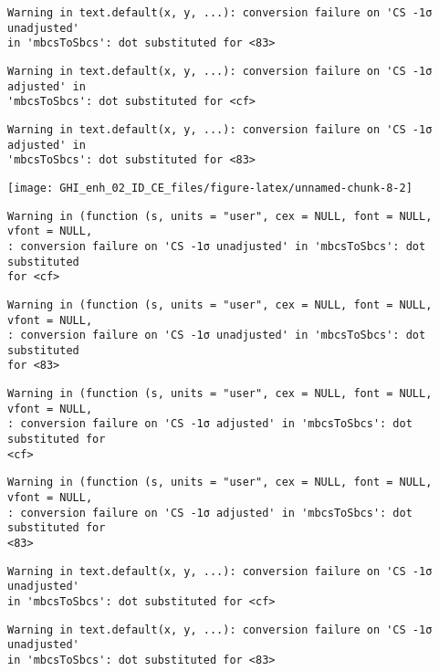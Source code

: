 \documentclass[
  10pt,
  a4paper,oneside]{article}
\begin{document}
\begin{verbatim}
Warning in text.default(x, y, ...): conversion failure on 'CS -1σ unadjusted'
in 'mbcsToSbcs': dot substituted for <83>
\end{verbatim}

\begin{verbatim}
Warning in text.default(x, y, ...): conversion failure on 'CS -1σ adjusted' in
'mbcsToSbcs': dot substituted for <cf>
\end{verbatim}

\begin{verbatim}
Warning in text.default(x, y, ...): conversion failure on 'CS -1σ adjusted' in
'mbcsToSbcs': dot substituted for <83>
\end{verbatim}

\begin{center}\texttt{[image: GHI\_enh\_02\_ID\_CE\_files/figure-latex/unnamed-chunk-8-2]} \end{center}

\begin{verbatim}
Warning in (function (s, units = "user", cex = NULL, font = NULL, vfont = NULL,
: conversion failure on 'CS -1σ unadjusted' in 'mbcsToSbcs': dot substituted
for <cf>
\end{verbatim}

\begin{verbatim}
Warning in (function (s, units = "user", cex = NULL, font = NULL, vfont = NULL,
: conversion failure on 'CS -1σ unadjusted' in 'mbcsToSbcs': dot substituted
for <83>
\end{verbatim}

\begin{verbatim}
Warning in (function (s, units = "user", cex = NULL, font = NULL, vfont = NULL,
: conversion failure on 'CS -1σ adjusted' in 'mbcsToSbcs': dot substituted for
<cf>
\end{verbatim}

\begin{verbatim}
Warning in (function (s, units = "user", cex = NULL, font = NULL, vfont = NULL,
: conversion failure on 'CS -1σ adjusted' in 'mbcsToSbcs': dot substituted for
<83>
\end{verbatim}

\begin{verbatim}
Warning in text.default(x, y, ...): conversion failure on 'CS -1σ unadjusted'
in 'mbcsToSbcs': dot substituted for <cf>
\end{verbatim}

\begin{verbatim}
Warning in text.default(x, y, ...): conversion failure on 'CS -1σ unadjusted'
in 'mbcsToSbcs': dot substituted for <83>
\end{verbatim}
\end{document}
